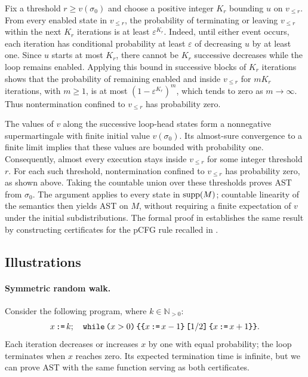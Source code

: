 Fix a threshold $r\geq v(\sigma_0)$ and choose a positive integer
$K_r$ bounding $u$ on $v_{\leq r}$.
From every enabled state in $v_{\leq r}$, the probability of terminating
or leaving $v_{\leq r}$ within the next $K_r$ iterations is at least
$\varepsilon^{K_r}$.
Indeed, until either event occurs, each iteration has conditional
probability at least $\varepsilon$ of decreasing $u$ by at least one.
Since $u$ starts at most $K_r$, there cannot be $K_r$ successive
decreases while the loop remains enabled.
Applying this bound in successive blocks of $K_r$ iterations shows
that the probability of remaining enabled and inside $v_{\leq r}$
for $mK_r$ iterations, with $m\geq1$, is at most
$(1-\varepsilon^{K_r})^m$, which tends to zero as $m\to\infty$.
Thus nontermination confined to $v_{\leq r}$ has probability zero.

The values of $v$ along the successive loop-head states form a
nonnegative supermartingale with finite initial value $v(\sigma_0)$.
Its almost-sure convergence to a finite limit implies that these values
are bounded with probability one. Consequently, almost every execution
stays inside $v_{\leq r}$ for some integer threshold $r$.
For each such threshold, nontermination confined to $v_{\leq r}$ has
probability zero, as shown above. Taking the countable union over these
thresholds proves AST from $\sigma_0$.
The argument applies to every state in $\textnormal{supp}(M)$; countable linearity
of the semantics then yields AST on $M$, without requiring a finite
expectation of $v$ under the initial subdistributions.
The formal proof in  establishes the same result
by constructing certificates for the pCFG rule recalled in
.

\subsection{Illustrations}
\label{sec:rule-examples}

\paragraph{Symmetric random walk.}
Consider the following program, where $k\in\mathbb N_{>0}$:
\[
 x\,\textnormal{\texttt{:=}}\, k;\quad
 \textnormal{\texttt{while}}\,\textnormal{\texttt{(}} x>0\textnormal{\texttt{)}}\,\textnormal{\texttt{\{}}\textnormal{\texttt{\{}}x\,\textnormal{\texttt{:=}}\, x-1\textnormal{\texttt{\}}} \, \textnormal{\texttt{[}}1/2\textnormal{\texttt{]}} \, \textnormal{\texttt{\{}}x\,\textnormal{\texttt{:=}}\, x+1\textnormal{\texttt{\}}}\textnormal{\texttt{\}}}.
\]
Each iteration decreases or increases $x$ by one with equal probability;
the loop terminates when $x$ reaches zero.
Its expected termination time is infinite, but we can prove AST with
the same function serving as both certificates.

